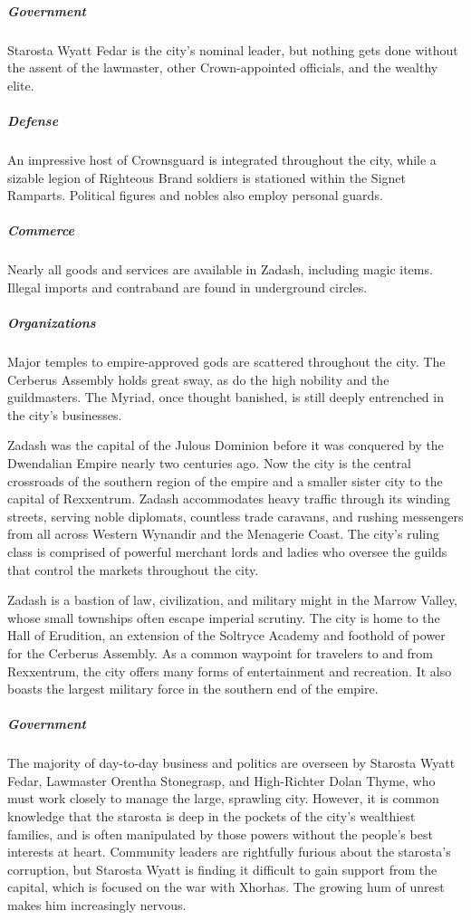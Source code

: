 \documentclass[10pt,a4paper,twoside,bg=print,twocolumn,openany,nodeprecatedcode]{dndbook}
\begin{document}
\subparagraph{Government}
Starosta Wyatt Fedar is the city's nominal leader, but nothing gets done without the assent of the lawmaster, other Crown-appointed officials, and the wealthy elite.

\subparagraph{Defense}
An impressive host of Crownsguard is integrated throughout the city, while a sizable legion of Righteous Brand soldiers is stationed within the Signet Ramparts. Political figures and nobles also employ personal guards.

\subparagraph{Commerce}
Nearly all goods and services are available in Zadash, including magic items. Illegal imports and contraband are found in underground circles.

\subparagraph{Organizations}
Major temples to empire-approved gods are scattered throughout the city. The Cerberus Assembly holds great sway, as do the high nobility and the guildmasters. The Myriad, once thought banished, is still deeply entrenched in the city's businesses.

Zadash was the capital of the Julous Dominion before it was conquered by the Dwendalian Empire nearly two centuries ago. Now the city is the central crossroads of the southern region of the empire and a smaller sister city to the capital of Rexxentrum. Zadash accommodates heavy traffic through its winding streets, serving noble diplomats, countless trade caravans, and rushing messengers from all across Western Wynandir and the Menagerie Coast. The city's ruling class is comprised of powerful merchant lords and ladies who oversee the guilds that control the markets throughout the city.

Zadash is a bastion of law, civilization, and military might in the Marrow Valley, whose small townships often escape imperial scrutiny. The city is home to the Hall of Erudition, an extension of the Soltryce Academy and foothold of power for the Cerberus Assembly. As a common waypoint for travelers to and from Rexxentrum, the city offers many forms of entertainment and recreation. It also boasts the largest military force in the southern end of the empire.

\subparagraph{Government}
The majority of day-to-day business and politics are overseen by Starosta Wyatt Fedar, Lawmaster Orentha Stonegrasp, and High-Richter Dolan Thyme, who must work closely to manage the large, sprawling city. However, it is common knowledge that the starosta is deep in the pockets of the city's wealthiest families, and is often manipulated by those powers without the people's best interests at heart. Community leaders are rightfully furious about the starosta's corruption, but Starosta Wyatt is finding it difficult to gain support from the capital, which is focused on the war with Xhorhas. The growing hum of unrest makes him increasingly nervous.
\end{document}
